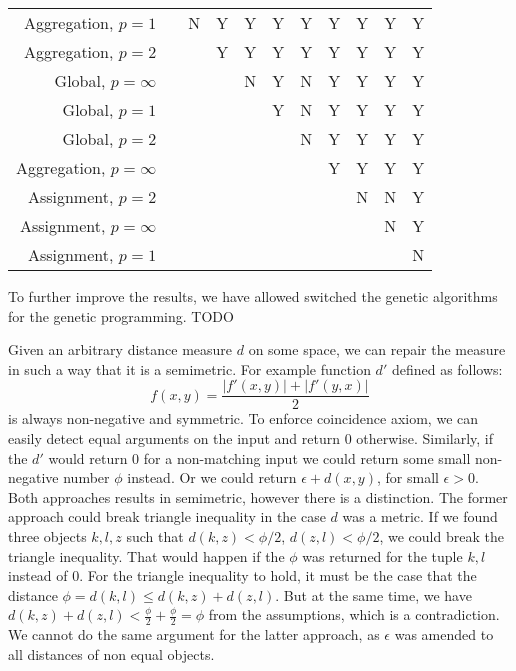 \documentclass{article}
\begin{document}
\begin{refsegment}
\begin{table}[ht]
\begin{tabular}{r|cccccccccc}
 		
 		\\ \hline
 		Aggregation, $p=1$        &   & N & Y & Y&Y &Y &Y &Y &Y & Y  \\ 
 		Aggregation, $p=2$        &   & & Y & Y& Y& Y& Y& Y&Y & Y  \\ 
 		Global, $p=\infty$       &   & &  &N & Y & N & Y & Y & Y & Y  \\ 
 		Global, $p=1$        &   & &  & & Y & N & Y & Y & Y & Y  \\  
 		Global, $p=2$        &   & &  & &  & N & Y & Y & Y & Y  \\  
 		Aggregation, $p=\infty$    &   & &  & &  & & Y & Y & Y & Y  \\  
 		Assignment, $p=2$     &   & &  & & & & &N & N& Y  \\ 
 		Assignment, $p=\infty$   &   & &  & & & & & & N& Y  \\ 
 		Assignment, $p=1$     &   & &  & & & & & & & N  \\ 
 		\hline
 	\end{tabular} 
 \end{table}

To further improve the results, we have allowed switched the genetic algorithms for the genetic programming.
TODO

Given an arbitrary distance measure $d$ on some space, we can repair the measure in such a way that it is a semimetric. For example function $d'$ defined as follows:
\begin{equation}
\label{eq:semimetricRepairment}
f(x,y) = \frac{|f'(x,y)|+|f'(y,x)|}{2}
\end{equation}
is always non-negative and symmetric. To enforce coincidence axiom, we can easily detect equal arguments on the input and return 0 otherwise. Similarly, if the $d'$ would return 0 for a non-matching input we could return some small non-negative number $\phi$ instead. Or we could return $\epsilon + d(x,y)$, for small $\epsilon > 0$. Both approaches results in semimetric, however there is a distinction. The former approach could break triangle inequality in the case $d$ was a metric. If we found three objects $k,l, z$ such that $d(k,z) < \phi/2$, $d(z, l) < \phi/2$, we could break the triangle inequality. That would happen if the $\phi$ was returned for the tuple $k,l$ instead of 0. For the triangle inequality to hold, it must be the case that the distance $\phi = d(k,l) \le d(k,z) + d(z,l)$. But at the same time, we have $d(k,z) + d(z,l)< \frac{\phi}{2} + \frac{\phi}{2}  = \phi$ from the assumptions, which is a contradiction.
We cannot do the same argument for the latter approach, as $\epsilon$ was amended to all distances of non equal objects.


\end{refsegment}
\end{document}
